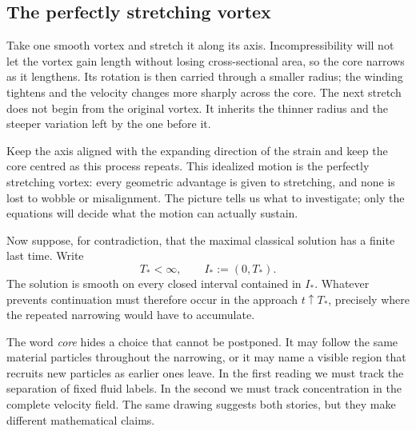 \subsection{The perfectly stretching vortex}\label{sub:ThePerfectlyStretchingVortex}

Take one smooth vortex and stretch it along its axis.  Incompressibility will
not let the vortex gain length without losing cross-sectional area, so the core
narrows as it lengthens.  Its rotation is then carried through a smaller radius;
the winding tightens and the velocity changes more sharply across the core.
The next stretch does not begin from the original vortex.  It inherits the
thinner radius and the steeper variation left by the one before it.

Keep the axis aligned with the expanding direction of the strain and keep the
core centred as this process repeats.  This idealized motion is the perfectly
stretching vortex: every geometric advantage is given to stretching, and none
is lost to wobble or misalignment.  The picture tells us what to investigate;
only the equations will decide what the motion can actually sustain.

Now suppose, for contradiction, that the maximal classical solution has a
finite last time.  Write
\[
  T_*<\infty,
  \qquad
  I_*:=(0,T_*).
\]
The solution is smooth on every closed interval contained in \(I_*\).  Whatever
prevents continuation must therefore occur in the approach
\(t\uparrow T_*\), precisely where the repeated narrowing would have to
accumulate.

The word \emph{core} hides a choice that cannot be postponed.  It may follow
the same material particles throughout the narrowing, or it may name a visible
region that recruits new particles as earlier ones leave.  In the first reading
we must track the separation of fixed fluid labels.  In the second we must
track concentration in the complete velocity field.  The same drawing suggests
both stories, but they make different mathematical claims.

